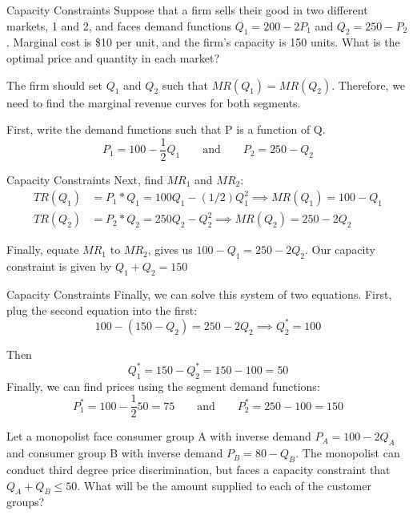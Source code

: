 \documentclass[11pt,t]{beamer}
\begin{document}
\begin{frame}{Capacity Constraints}
  Suppose that a firm sells their good in two different markets, 1 and 2, and faces demand functions $Q_1 = 200 - 2P_1$ and $Q_2 = 250 - P_2$. Marginal cost is \$10 per unit, and the firm's capacity is 150 units. What is the optimal price and quantity in each market?

  \bigskip\pause
  The firm should set $Q_1$ and $Q_2$ such that $MR(Q_1) = MR(Q_2)$. Therefore, we need to find the marginal revenue curves for both segments.

  \bigskip
  First, write the demand functions such that P is a function of Q.
  $$
    P_1=100-\frac{1}{2}Q_1 \qquad \text{and} \qquad P_2=250 - Q_2
  $$
\end{frame}

\begin{frame}{Capacity Constraints}
  Next, find $MR_1$ and $MR_2$:
  \begin{align*}
    TR(Q_1) &= P_1*Q_1 = 100Q_1 - (1/2)Q_1^2 \implies MR(Q_1) = 100 - Q_1 \\
    TR(Q_2) &= P_2*Q_2 = 250Q_2 - Q_2^2 \implies MR(Q_2) = 250 - 2Q_2
  \end{align*}
  
  \bigskip
  Finally, equate $MR_1$ to $MR_2$, gives us $100 - Q_1 = 250 - 2Q_2$. Our capacity constraint is given by $Q_1 + Q_2 = 150$
\end{frame}

\begin{frame}{Capacity Constraints}
  Finally, we can solve this system of two equations. First, plug the second equation into the first:
  $$
    100 - (150 - Q_2) = 250 - 2Q_2 \implies Q_2^* = 100
  $$

  Then
  $$
    Q_1^* = 150 - Q_2^* = 150-100 = 50
  $$
  Finally, we can find prices using the segment demand functions:
  $$
    P_1^* = 100 - \frac{1}{2} 50 = 75 \qquad \text{and} \qquad P_2^* = 250 - 100 = 150
  $$
\end{frame}

\begin{frame}{}
  Let a monopolist face consumer group A with inverse demand $P_A = 100 - 2Q_A$ and consumer group B with inverse demand $P_B = 80 - Q_B$.  The monopolist can conduct third degree price discrimination, but faces a capacity constraint that $Q_A + Q_B \leq 50$. What will be the amount supplied to each of the customer groups?
\end{frame}
\end{document}
